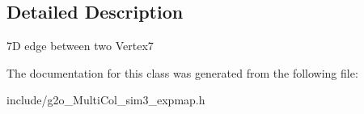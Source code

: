 \subsection{Detailed Description}
7D edge between two Vertex7 

The documentation for this class was generated from the following file\+:\begin{DoxyCompactItemize}
\item 
include/g2o\+\_\+\+Multi\+Col\+\_\+sim3\+\_\+expmap.\+h\end{DoxyCompactItemize}
